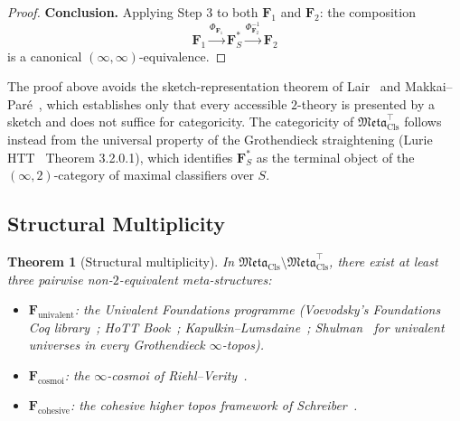 \documentclass[11pt]{article}
\theoremstyle{plain}
\newtheorem{theorem}{Theorem}[section]
\theoremstyle{definition}
\newcommand{\Meta}{\mathfrak{Meta}}
\begin{document}
\begin{proof}
\textbf{Conclusion.} Applying Step 3 to both $\mathbf{F}_1$ and $\mathbf{F}_2$: the composition
\[ \mathbf{F}_1 \xrightarrow{\Phi_{\mathbf{F}_1}} \mathbf{F}_S^* \xrightarrow{\Phi_{\mathbf{F}_2}^{-1}} \mathbf{F}_2 \]
is a canonical $(\infty, \infty)$-equivalence.
\end{proof}

The proof above avoids the sketch-representation theorem of Lair~\cite{Lair1981} and Makkai--Par\'e~\cite{MakkaiPare1989}, which establishes only that every accessible $2$-theory is presented by a sketch and does not suffice for categoricity. The categoricity of $\Meta_{\mathrm{Cls}}^{\top}$ follows instead from the universal property of the Grothendieck straightening (Lurie HTT~\cite{LurieHTT} Theorem 3.2.0.1), which identifies $\mathbf{F}_S^*$ as the terminal object of the $(\infty, 2)$-category of maximal classifiers over $S$.

\subsection{Structural Multiplicity}

\begin{theorem}[Structural multiplicity]\label{thm:meta-mult}
In $\Meta_{\mathrm{Cls}} \setminus \Meta_{\mathrm{Cls}}^{\top}$, there exist at least three pairwise non-$2$-equivalent meta-structures:
\begin{itemize}
\item $\mathbf{F}_{\mathrm{univalent}}$: the Univalent Foundations programme (Voevodsky's \emph{Foundations} Coq library~\cite{VoevodskyFoundations2010}; HoTT Book~\cite{HoTTBook2013}; Kapulkin--Lumsdaine~\cite{KapulkinLumsdaine2021}; Shulman~\cite{Shulman2019} for univalent universes in every Grothendieck $\infty$-topos).
\item $\mathbf{F}_{\mathrm{cosmoi}}$: the $\infty$-cosmoi of Riehl--Verity~\cite{RiehlVerity2022}.
\item $\mathbf{F}_{\mathrm{cohesive}}$: the cohesive higher topos framework of Schreiber~\cite{Schreiber2013}.
\end{itemize}
\end{theorem}
\end{document}
